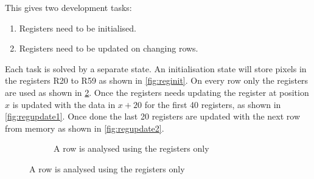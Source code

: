 \documentclass[a4paper, english]{article}
\numberwithin{equation}{section}
\begin{document}
This gives two development tasks:
\begin{enumerate}
    \item Registers need to be initialised.
    \item Registers need to be updated on changing rows.
\end{enumerate}
Each task is solved by a separate state. An initialisation state will store pixels in the registers R20 to R59 as shown in \cref{fig:reginit}. On every row only the registers are used as shown in \cref{fig:regcheck}. Once the registers needs updating the register at position \(x\) is updated with the data in \(x+20\) for the first 40 registers, as shown in \cref{fig:regupdate1}. Once done the last 20 registers are updated with the next row from memory as shown in \cref{fig:regupdate2}.
\begin{figure}[H]
    \centering
    \caption{Data register handling}\label{fig:update}
    \begin{subfigure}[t]{.3\textwidth}
        \centering
        \caption{A row is analysed using the registers only}\label{fig:regcheck}
\end{subfigure}
\end{figure}
\end{document}
